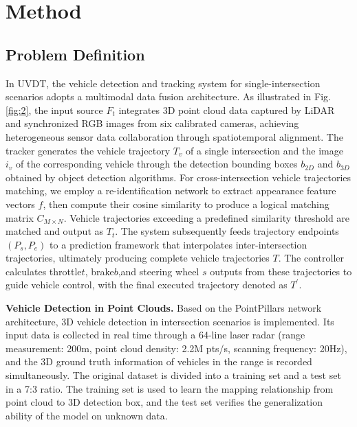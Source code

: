 \documentclass[journal,twoside,web]{ieeecolor}
\begin{document}
\section{Method}

\subsection{Problem Definition}

In UVDT, the vehicle detection and tracking system for single-intersection scenarios adopts a multimodal data fusion architecture.
As illustrated in Fig. \ref{fig:2}, the input source \(F_{t}\) integrates 3D point cloud data captured by LiDAR and synchronized RGB images from six calibrated cameras, achieving heterogeneous sensor data collaboration through spatiotemporal alignment.
The tracker generates the vehicle trajectory \(T_{v}\) of a single intersection and the image \(i_{v}\) of the corresponding vehicle through the detection bounding boxes \(b_{2D}\) and \(b_{3D}\) obtained by object detection algorithms.
For cross-intersection vehicle trajectories matching, we employ a re-identification network to extract appearance feature vectors \(f\), then compute their cosine similarity to produce a logical matching matrix \(C_{M \times N}\).
Vehicle trajectories exceeding a predefined similarity threshold are matched and output as \(T_{t}\).
The system subsequently feeds trajectory endpoints \((P_{s},P_{e})\) to a prediction framework that interpolates inter-intersection trajectories, ultimately producing complete vehicle trajectories \(T\). 
The controller calculates throttle\(t\), brake\(b\),and steering wheel \(s\) outputs from these trajectories to guide vehicle control, with the final executed trajectory denoted as \(T^\prime\).

\textbf{Vehicle Detection in Point Clouds.}
Based on the PointPillars network architecture, 3D vehicle detection in intersection scenarios is implemented. Its input data is collected in real time through a 64-line laser radar (range measurement: 200m, point cloud density: 2.2M pts/s, scanning frequency: 20Hz), and the 3D ground truth information of vehicles in the range is recorded simultaneously. The original dataset is divided into a training set and a test set in a 7:3 ratio. The training set is used to learn the mapping relationship from point cloud to 3D detection box, and the test set verifies the generalization ability of the model on unknown data.
\end{document}
